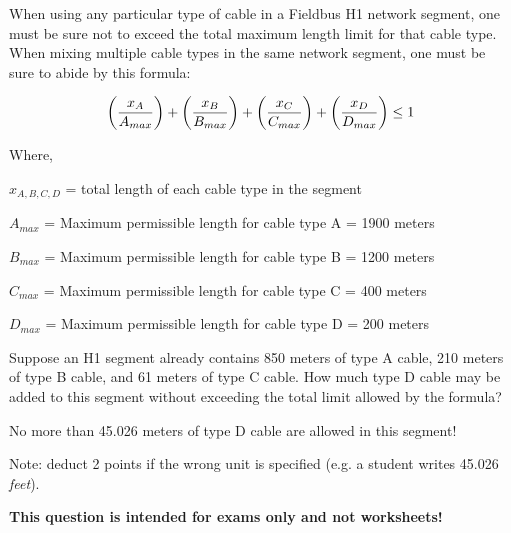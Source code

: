 

When using any particular type of cable in a Fieldbus H1 network segment, one must be sure not to exceed the total maximum length limit for that cable type.  When mixing multiple cable types in the same network segment, one must be sure to abide by this formula:

$$\left({x_A \over A_{max}}\right) + \left({x_B \over B_{max}}\right) + \left({x_C \over C_{max}}\right) + \left({x_D \over D_{max}}\right)\leq 1$$

\noindent
Where,

$x_{A,B,C,D}$ = total length of each cable type in the segment

$A_{max}$ = Maximum permissible length for cable type A = 1900 meters

$B_{max}$ = Maximum permissible length for cable type B = 1200 meters

$C_{max}$ = Maximum permissible length for cable type C = 400 meters

$D_{max}$ = Maximum permissible length for cable type D = 200 meters

\vskip 10pt

Suppose an H1 segment already contains 850 meters of type A cable, 210 meters of type B cable, and 61 meters of type C cable.  How much type D cable may be added to this segment without exceeding the total limit allowed by the formula?







No more than 45.026 meters of type D cable are allowed in this segment!

\vskip 10pt

Note: deduct 2 points if the wrong unit is specified (e.g. a student writes 45.026 {\it feet}).







{\bf This question is intended for exams only and not worksheets!}



